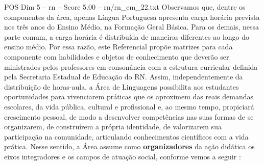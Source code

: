 \begin{textsample}{POS Dim 5 – rn – Score 5.00 – rn/rn\_em\_22.txt}
Observamos que, dentre os componentes da área, apenas Língua Portuguesa apresenta carga horária prevista nos três anos do Ensino Médio, na Formação Geral Básica.
Para os demais, nessa parte comum, a carga horária é distribuída de maneiras diferentes ao longo do ensino médio.
Por essa razão, este Referencial propõe matrizes para cada componente com habilidades e objetos de conhecimento que deverão ser ministrados pelos professores em consonância com a estrutura curricular definida pela Secretaria Estadual de Educação do RN.
Assim, independentemente da distribuição de horas-aula, a Área de Linguagens possibilita aos estudantes oportunidades para vivenciarem práticas que os aproximem das reais demandas escolares, da vida pública, cultural e profissional e, ao mesmo tempo, propiciará crescimento pessoal, de modo a desenvolver competências nas suas formas de se organizarem, de construírem a própria identidade, de valorizarem sua participação na comunidade, articulando conhecimentos científicos com a vida prática.
Nesse sentido, a Área assume como \textbf{organizadores} da ação didática os eixos integradores e os campos de atuação social, conforme vemos a seguir :

\end{textsample}
